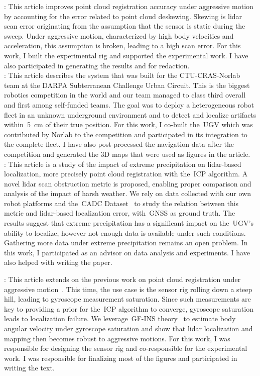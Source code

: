 \documentclass[12pt,letterpaper,oneside]{article}
\begin{document}
\textbf{}: 
This article improves point cloud registration accuracy under aggressive motion by accounting for the error related to point cloud deskewing.
Skewing is lidar scan error originating from the assumption that the sensor is static during the sweep.
Under aggressive motion, characterized by high body velocities and acceleration, this assumption is broken, leading to a high scan error.
For this work, I built the experimental rig and supported the experimental work.
I have also participated in generating the results and for redaction.
\\

\textbf{}:
This article describes the system that was built for the CTU-CRAS-Norlab team at the DARPA Subterranean Challenge Urban Circuit.
This is the biggest robotics competition in the world and our team managed to class third overall and first among self-funded teams.
The goal was to deploy a heterogeneous robot fleet in an unknown underground environment and to detect and localize artifacts within~\SI{5}{\centi\meter} of their true position.
For this work, I co-built the~\ac{UGV} which was contributed by Norlab to the competition and participated in its integration to the complete fleet.
I have also post-processed the navigation data after the competition and generated the 3D maps that were used as figures in the article.
\\

\textbf{}:
This article is a study of the impact of extreme precipitation on lidar-based localization, more precisely point cloud registration with the~\ac{ICP} algorithm.
A novel lidar scan obstruction metric is proposed, enabling proper comparison and analysis of the impact of harsh weather.
We rely on data collected with our own robot platforms and the~\ac{CADC} Dataset~\citep{Pitropov2021} to study the relation between this metric and lidar-based localization error, with~\ac{GNSS} as ground truth.
The results suggest that extreme precipitation has a significant impact on the~\ac{UGV}'s ability to localize, however not enough data is available under such conditions.
Gathering more data under extreme precipitation remains an open problem.
In this work, I participated as an advisor on data analysis and experiments.
I have also helped with writing the paper.

\textbf{}:
This article extends on the previous work on point cloud registration under aggressive motion~\citep{Deschenes2021}.
This time, the use case is the sensor rig rolling down a steep hill, leading to gyroscope measurement saturation.
Since such measurements are key to providing a prior for the~\ac{ICP} algorithm to converge, gyroscope saturation leads to localization failure.
We leverage~\ac{GF}-\ac{INS} theory~\citep{Pachter2013} to estimate body angular velocity under gyroscope saturation and show that lidar localization and mapping then becomes robust to aggressive motions.
For this work, I was responsible for designing the sensor rig and co-responsible for the experimental work.
I was responsible for finalizing most of the figures and participated in writing the text.
\end{document}
